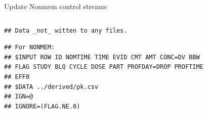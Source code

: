 \documentclass[
  8pt,
  ignorenonframetext,
  aspectratio=169]{beamer}
\newenvironment{Shaded}{\begin{snugshade}}{\end{snugshade}}
\newcommand{\CharTok}[1]{\textcolor[rgb]{0.31,0.60,0.02}{#1}}
\newcommand{\CommentTok}[1]{\textcolor[rgb]{0.56,0.35,0.01}{\textit{#1}}}
\newcommand{\DataTypeTok}[1]{\textcolor[rgb]{0.13,0.29,0.53}{#1}}
\newcommand{\KeywordTok}[1]{\textcolor[rgb]{0.13,0.29,0.53}{\textbf{#1}}}
\newcommand{\NormalTok}[1]{#1}
\newcommand{\StringTok}[1]{\textcolor[rgb]{0.31,0.60,0.02}{#1}}
\begin{document}
\begin{frame}[fragile]{Update Nonmem control streams}
\begin{columns}[T]
\begin{column}{0.48\textwidth}
\begin{verbatim}
## Data _not_ witten to any files.
\end{verbatim}

\begin{verbatim}
## For NONMEM:
## $INPUT ROW ID NOMTIME TIME EVID CMT AMT CONC=DV BBW
## FLAG STUDY BLQ CYCLE DOSE PART PROFDAY=DROP PROFTIME
## EFF0
## $DATA ../derived/pk.csv
## IGN=@
## IGNORE=(FLAG.NE.0)
\end{verbatim}

\begin{Shaded}
\end{Shaded}

\normalsize
\end{column}
\end{columns}
\end{frame}
\end{document}
